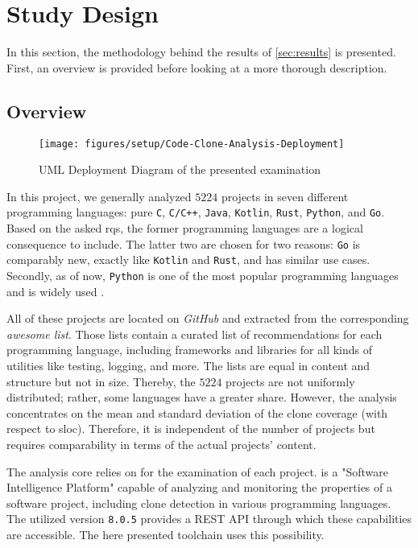 
\section{Study Design}
\label{sec:study_design}

In this section, the methodology behind the results of \autoref{sec:results} is presented. First, an overview is provided before looking at a more thorough description.

\subsection{Overview}

\begin{figure}[tbh]
	\centering
	\texttt{[image: figures/setup/Code-Clone-Analysis-Deployment]}
	\caption{UML Deployment Diagram of the presented examination}
	\label{fig:overview_deployment}
\end{figure}

In this project, we generally analyzed $5224$ projects in seven different programming languages: pure \texttt{C}, \texttt{C/C++}, \texttt{Java}, \texttt{Kotlin}, \texttt{Rust}, \texttt{Python}, and \texttt{Go}. Based on the asked \acp{rq}, the former programming languages are a logical consequence to include. The latter two are chosen for two reasons: \texttt{Go} is comparably new, exactly like \texttt{Kotlin} and \texttt{Rust}, and has similar use cases. Secondly, as of now, \texttt{Python} is one of the most popular programming languages and is widely used \cite{stackoverflow2021languages}.

All of these projects are located on \textit{GitHub} and extracted from the corresponding \textit{awesome list}\awesomeFootnote{}. Those lists contain a curated list of recommendations for each programming language, including frameworks and libraries for all kinds of utilities like testing, logging, and more.
The lists are equal in content and structure but not in size. Thereby, the $5224$ projects are not uniformly distributed; rather, some languages have a greater share. However, the analysis concentrates on the mean and standard deviation of the clone coverage (with respect to \ac{sloc}). Therefore, it is independent of the number of projects but requires comparability in terms of the actual projects’ content.

The analysis core relies on \teamscale{}\teamscaleFootnote{} for the examination of each project. \teamscale{} is a "Software Intelligence Platform" capable of analyzing and monitoring the properties of a software project, including clone detection in various programming languages. The utilized version \texttt{8.0.5} provides a REST API through which these capabilities are accessible. The here presented toolchain uses this possibility.

